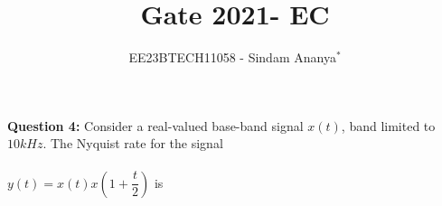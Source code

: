 \documentclass[journal,12pt,twocolumn]{IEEEtran}
\theoremstyle{remark}
\begin{document}

\vspace{3cm}

\title{Gate 2021- EC}
\author{EE23BTECH11058 - Sindam Ananya$^{*}$%
}
\maketitle
\newpage
\bigskip

\renewcommand{\thefigure}{\theenumi}
\renewcommand{\thetable}{\theenumi}

\vspace{3cm}
\textbf{Question 4:} 
Consider a real-valued base-band signal $x(t)$, band limited to $10kHz$. The Nyquist rate for the signal \\\\
$y(t) = x(t)x(1+\dfrac{t}{2})$ is\\
\end{document}
